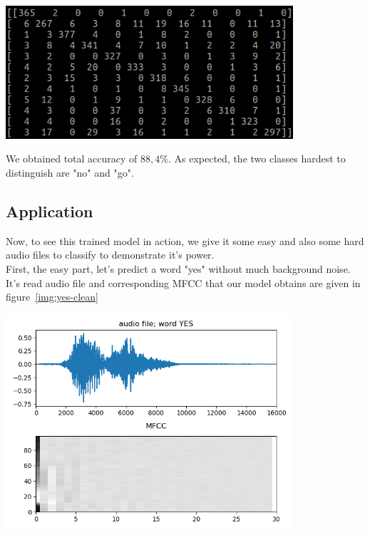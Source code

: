 \documentclass[twoside]{article}
\newenvironment{Figure}
  {\par\medskip\noindent\minipage{\linewidth}}
  {\endminipage\par\medskip}
\begin{document}
\begin{multicols}{2}
\begin{Figure}
	\centering
	\includegraphics[width=0.8\textwidth]{train_18000}
	\label{img:tr-4000}
\end{Figure}

\noindent We obtained total accuracy of $88,4\%$. As expected, the two classes hardest to distinguish are "no" and "go". 

\subsection{Application}
Now, to see this trained model in action, we give it some easy and also some hard audio files to classify to demonstrate it's power.\\

First, the easy part, let's predict a word "yes" without much background noise. It's read audio file and corresponding MFCC that our model obtains are given in figure~\ref{img:yes-clean}

\begin{Figure}
	\centering
	\includegraphics[width=0.8\textwidth]{yes_clean}
	\label{img:yes-clean}
\end{Figure}


\end{multicols}
\end{document}
